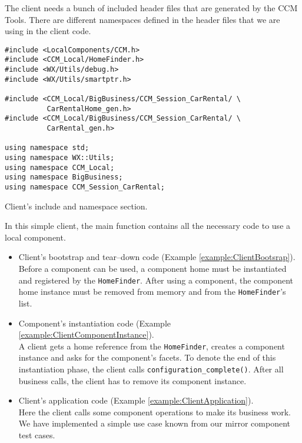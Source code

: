 The client needs a bunch of included header files that are generated by the CCM Tools.
There are different namespaces defined in the header files that we are using in the 
client code.
\begin{Example}
\begin{minifbox}
\begin{small}
\begin{verbatim}
#include <LocalComponents/CCM.h>
#include <CCM_Local/HomeFinder.h>
#include <WX/Utils/debug.h>
#include <WX/Utils/smartptr.h>

#include <CCM_Local/BigBusiness/CCM_Session_CarRental/ \
          CarRentalHome_gen.h>
#include <CCM_Local/BigBusiness/CCM_Session_CarRental/ \
          CarRental_gen.h>

using namespace std;
using namespace WX::Utils;
using namespace CCM_Local;
using namespace BigBusiness;
using namespace CCM_Session_CarRental;
\end{verbatim}
\end{small}
\end{minifbox}
\caption{Client's include and namespace section.}
\label{example:}
\end{Example}

In this simple client, the main function contains all the necessary code to use
a local component. 
\begin{itemize}
\item Client's bootstrap and tear--down code (Example \ref{example:ClientBootsrap}).\\
Before a component can be used, a component home must be instantiated and registered
by the {\tt HomeFinder}.
After using a component, the component home instance must be removed from memory and
from the {\tt HomeFinder}'s list.
\item Component's instantiation code (Example \ref{example:ClientComponentInstance}). \\
A client gets a home reference from the {\tt HomeFinder}, creates a component 
instance and asks for the component's facets.
To denote the end of this instantiation phase, the client calls {\tt configuration\_complete()}.
After all business calls, the client has to remove its component instance.

\item Client's application code (Example \ref{example:ClientApplication}). \\
Here the client calls some component operations to make its business work.
We have implemented a simple use case known from our mirror component test cases.
\end{itemize}

